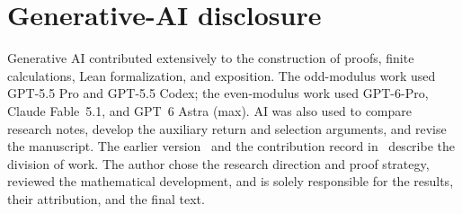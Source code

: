 \documentclass[11pt,reqno]{amsart}
\numberwithin{equation}{section}
\theoremstyle{definition}
\theoremstyle{remark}
\begin{document}
\section*{Generative-AI disclosure}
Generative AI contributed extensively to the construction of proofs,
finite calculations, Lean formalization, and exposition. The odd-modulus
work used GPT-5.5 Pro and GPT-5.5 Codex; the even-modulus work used
GPT-6-Pro, Claude Fable~5.1, and GPT~6 Astra (max). AI was also used to
compare research notes, develop the auxiliary return and selection
arguments, and revise the manuscript. The earlier version~\cite{ParkVtwo}
and the contribution record in~\cite{TorusLean} describe the division of
work. The author chose the research direction and proof strategy,
reviewed the mathematical development, and is solely responsible for
the results, their attribution, and the final text.
\end{document}
